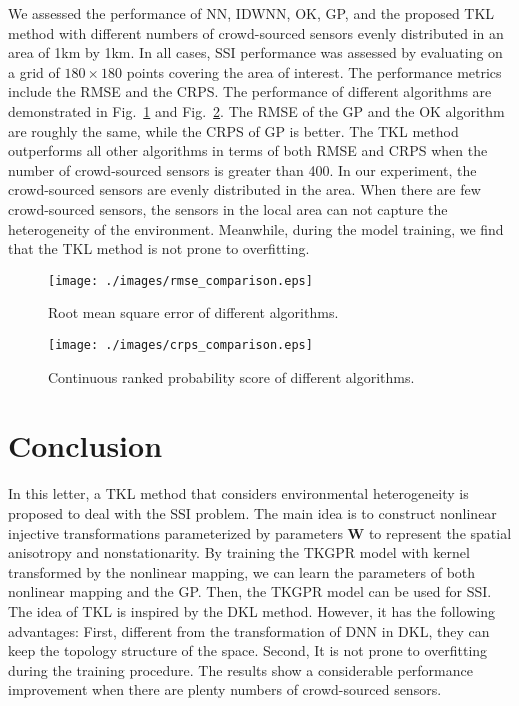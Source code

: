 \documentclass[journal, oneside, twocolumn]{IEEEtran}
\begin{document}
We assessed the performance of NN, IDWNN, OK, GP, and the proposed TKL method with different numbers of crowd-sourced sensors evenly distributed in an area of 1km by 1km. In all cases, SSI performance was assessed by evaluating on a grid of $180\times180$ points covering the area of interest. The performance metrics include the RMSE and the CRPS\cite{Gneiting2007}.
The performance of different algorithms are demonstrated in Fig.~\ref{fig:rmse} and Fig.~\ref{fig:crps}. The RMSE of the GP and the OK algorithm are roughly the same, while the CRPS of GP is better. The TKL method outperforms all other algorithms in terms of both RMSE and CRPS when the number of crowd-sourced sensors is greater than 400. In our experiment, the crowd-sourced sensors are evenly distributed in the area. When there are few crowd-sourced sensors, the sensors in the local area can not capture the heterogeneity of the environment. Meanwhile, during the model training, we find that the TKL method is not prone to overfitting.

\begin{figure}[!tb]
  \centering
  \texttt{[image: ./images/rmse\_comparison.eps]}
  \caption{Root mean square error of different algorithms.}
  \label{fig:rmse}
\end{figure}

\begin{figure}[!tb]
  \centering
  \texttt{[image: ./images/crps\_comparison.eps]}
  \caption{Continuous ranked probability score of different algorithms.}
  \label{fig:crps}
\end{figure}

\section{Conclusion}
In this letter, a TKL method that considers environmental heterogeneity is proposed to deal with the SSI problem. The main idea is to construct nonlinear injective transformations parameterized by parameters $\mathbf{W}$ to represent the spatial anisotropy and nonstationarity. By training the TKGPR model with kernel transformed by the nonlinear mapping, we can learn the parameters of both nonlinear mapping and the GP. Then, the TKGPR model can be used for SSI. The idea of TKL is inspired by the DKL method. However, it has the following advantages: First, different from the transformation of DNN in DKL, they can keep the topology structure of the space.  Second, It is not prone to overfitting during the training procedure. The results show a considerable performance improvement when there are plenty numbers of crowd-sourced sensors.
\end{document}
